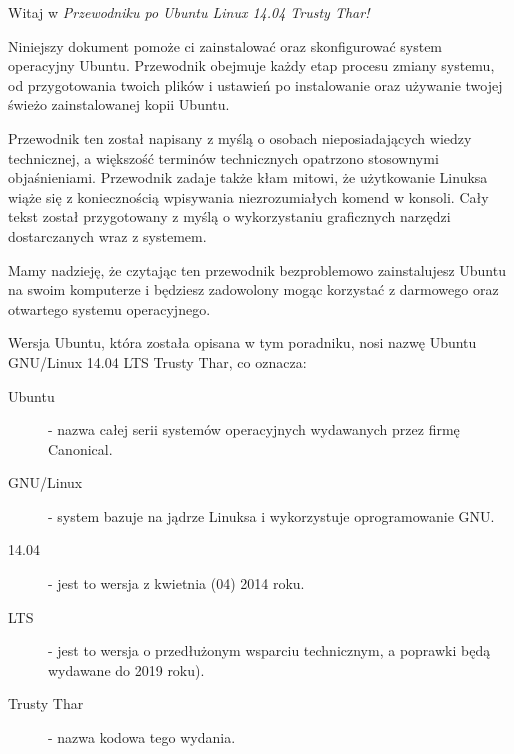 \noindent Witaj w \emph{Przewodniku po Ubuntu Linux 14.04 Trusty Thar!}

Niniejszy dokument pomoże ci zainstalować oraz skonfigurować system operacyjny Ubuntu. Przewodnik obejmuje każdy etap procesu zmiany systemu, od przygotowania twoich plików i ustawień po instalowanie oraz używanie twojej świeżo zainstalowanej kopii Ubuntu.

Przewodnik ten został napisany z myślą o osobach nieposiadających wiedzy technicznej, a większość terminów technicznych opatrzono stosownymi objaśnieniami. Przewodnik zadaje także kłam mitowi, że użytkowanie Linuksa wiąże się z koniecznością wpisywania niezrozumiałych komend w konsoli. Cały tekst został przygotowany z myślą o wykorzystaniu graficznych narzędzi dostarczanych wraz z systemem.

Mamy nadzieję, że czytając ten przewodnik bezproblemowo zainstalujesz Ubuntu na swoim komputerze i będziesz zadowolony mogąc korzystać z darmowego oraz otwartego systemu operacyjnego.

Wersja Ubuntu, która została opisana w tym poradniku, nosi nazwę Ubuntu GNU/Linux 14.04 LTS Trusty Thar, co oznacza:
\begin{description}
\item[Ubuntu] -  nazwa całej serii systemów operacyjnych wydawanych przez firmę Canonical.
\item[GNU/Linux] - system bazuje na jądrze Linuksa i wykorzystuje oprogramowanie GNU.
\item[14.04] - jest to wersja z kwietnia (04) 2014 roku.
\item[LTS] - jest to wersja o przedłużonym wsparciu technicznym, a poprawki będą wydawane do 2019 roku).
\item[Trusty Thar] - nazwa kodowa tego wydania.
\end{description}
\clearpage
